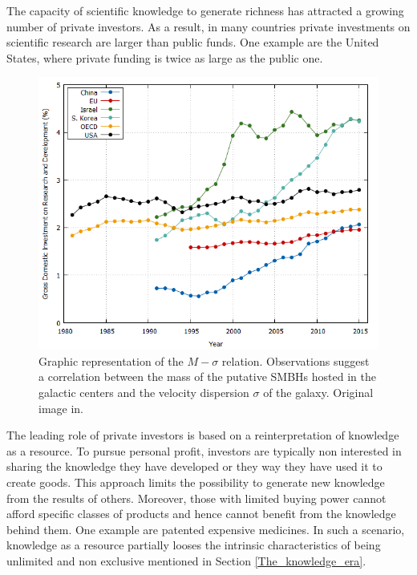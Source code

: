 The capacity of scientific knowledge to generate richness has attracted a growing number of private investors. As a result, in many countries private investments on scientific research are larger than public funds. One example are the United States, where private funding is twice as large as the public one. 

\begin{figure}[!t] 
 \begin{center}
 \includegraphics[scale=0.3]{Images/GD_investment.png}
 \caption{Graphic representation of the $M - \sigma$ relation. Observations suggest a correlation between the mass of the putative SMBHs hosted in the galactic centers and the velocity dispersion $\sigma$ of the galaxy. Original image in.}
 \label{M_sigma_relation}
 \end{center}
\end{figure}

The leading role of private investors is based on a reinterpretation of knowledge as a resource. To pursue personal profit, investors are typically non interested in sharing the knowledge they have developed or they way they have used it to create goods. This approach limits the possibility to generate new knowledge from the results of others. Moreover, those with limited buying power cannot afford specific classes of products and hence cannot benefit from the knowledge behind them. One example are patented expensive medicines. In such a scenario, knowledge as a resource partially looses the intrinsic characteristics of being unlimited and non exclusive mentioned in Section \ref{The_knowledge_era}. 

